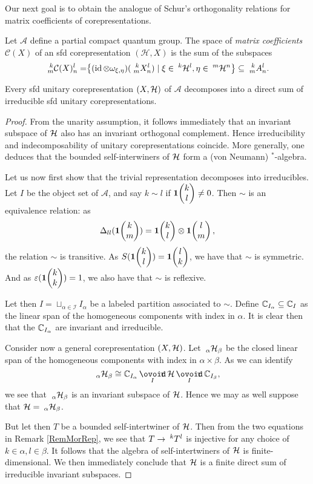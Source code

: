 Our next goal is to obtain the analogue of Schur's orthogonality
relations for matrix coefficients of corepresentations.

\begin{Def} Let $\mathscr{A}$ define a partial compact quantum group. The space of \emph{matrix coefficients} $\mathcal{C}(X)$ of an sfd corepresentation $(\mathcal{H},X)$ is the sum of
the subspaces
\begin{align*}
  \Gr{\mathcal{C}(X)}{k}{l}{m}{n} &= \span \left\{ (\id \otimes
  \omega_{\xi,\eta})(\Gr{X}{k}{l}{m}{n}) \mid \xi \in
  \Gru{\mathcal{H}}{k}{l}, \eta \in \Gru{\mathcal{H}}{m}{n} \right\}
\subseteq \Gr{A}{k}{l}{m}{n}.
\end{align*}
\end{Def}

\begin{Lem} Every sfd unitary corepresentation $(X,\Hsp)$ of $\mathscr{A}$ decomposes into a direct sum of irreducible sfd unitary corepresentations.
\end{Lem} 
\begin{proof} From the unarity assumption, it follows immediately that an invariant subspace of $\Hsp$ also has an invariant orthogonal complement. Hence irreducibility and indecomposability of unitary corepresentations coincide. More generally, one deduces that the bounded self-interwiners of $\Hsp$ form a (von Neumann) $^*$-algebra.

Let us now first show that the trivial representation decomposes into irreducibles. Let $I$ be the object set of $\mathscr{A}$, and say $k\sim l$ if $\UnitC{k}{l}\neq 0$. Then $\sim$ is an equivalence relation: as \[\Delta_{ll}(\UnitC{k}{m}) = \UnitC{k}{l}\otimes \UnitC{l}{m},\] the relation $\sim$ is transitive. As $S(\UnitC{k}{l}) = \UnitC{l}{k}$, we have that $\sim$ is symmetric. And as $\varepsilon(\UnitC{k}{k})=1$, we also have that $\sim$ is reflexive. 

Let then $I = \sqcup_{\alpha\in \mathscr{I}} I_{\alpha}$ be a labeled partition associated to $\sim$. Define $\C_{I_{\alpha}}\subseteq \C_I$ as the linear span of the homogeneous components with index in $\alpha$. It is clear then that the $\C_{I_{\alpha}}$ are invariant and irreducible.

Consider now a general corepresentation $(X,\Hsp)$. Let $\Grd{\Hsp}{\alpha}{\beta}$ be the closed linear span of the homogeneous components with index in $\alpha\times \beta$. As we can identify \[\Grd{\Hsp}{\alpha}{\beta} \cong \C_{I_{\alpha}}\,\Circt\, \Hsp\,\Circt\, \C_{I_{\beta}},\] we see that $\Grd{\Hsp}{\alpha}{\beta}$ is an invariant subspace of $\Hsp$. Hence we may as well suppose that $\Hsp = \Grd{\Hsp}{\alpha}{\beta}$. 

But let then $T$ be a bounded self-intertwiner of $\Hsp$. Then from the two equations in Remark \ref{RemMorRep}, we see that $T\rightarrow \Gru{T}{k}{l}$ is injective for any choice of $k\in \alpha,l\in \beta$. It follows that the algebra of self-intertwiners of $\Hsp$ is finite-dimensional. We then immediately conclude that $\Hsp$ is a finite direct sum of irreducible invariant subspaces.
\end{proof} 

